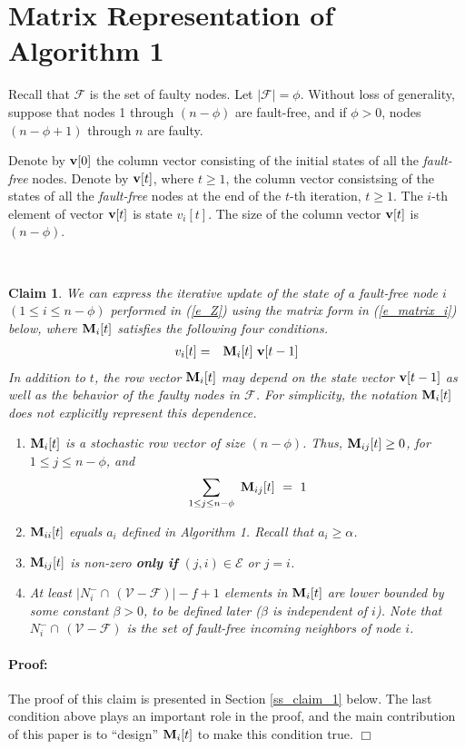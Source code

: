 \documentclass[letterpaper, 12pt]{article}
\newenvironment{proof}{\paragraph{\bf Proof:}}{\hspace*{\fill}\(\Box\)}
\newcommand{\scriptf}{\mathcal{F}}
\newcommand{\scripte}{\mathcal{E}}
\newcommand{\scriptv}{\mathcal{V}}
\newtheorem{claim}{Claim}
\begin{document}
\section{Matrix Representation of Algorithm 1}
\label{s_claim}

Recall that $\scriptf$ is the set of faulty nodes.
Let $|\scriptf|=\phi$.
Without loss of generality, suppose that nodes 1 through $(n-\phi)$ are
fault-free, and if $\phi>0$, nodes $(n-\phi+1)$ through $n$ are faulty.

Denote by ${\bf v}[0]$ the column vector consisting of the initial states of
all the {\em fault-free} nodes.
Denote by ${\bf v}[t]$, where $t\geq 1$, the column vector consistsing of
the states of all the {\em fault-free} nodes
at the end of the $t$-th iteration, $t\geq 1$.
The $i$-th element
of vector ${\bf v}[t]$ is state $v_i[t]$. The size of the column
vector ${\bf v}[t]$ is
$(n-\phi)$.



~

\begin{claim}
\label{claim_1}
{
We can express the iterative update of the state
of a fault-free node $i$ $(1\leq i\leq n-\phi)$
performed in (\ref{e_Z}) using the matrix form in (\ref{e_matrix_i})
below,
where ${\bf M}_i[t]$ satisfies the following four conditions.
\begin{eqnarray}
v_i[t] & = & {\bf M}_i[t] ~ {{\bf v}}[t-1]
\label{e_matrix_i}
\end{eqnarray}
}
In addition to $t$, the row vector ${\bf M}_i[t]$ 
may depend on the state vector ${\bf v}[t-1]$ as well as the
behavior of the faulty
nodes in $\scriptf$. For simplicity, the notation ${\bf M}_i[t]$ does not
explicitly represent this dependence. 
\begin{enumerate}
\item ${\bf M}_i[t]$ is a {\em stochastic} row vector of size $(n-\phi)$.
Thus,
${\bf M}_{ij}[t]\geq 0$, for $1\leq j\leq n-\phi$, and
\[
\sum_{1\leq j\leq n-\phi}~{\bf M}_{ij}[t] ~ = ~ 1
\]

\item ${\bf M}_{ii}[t]$ equals $a_i$ defined in Algorithm 1. 
Recall that $a_i\geq \alpha$.

\item ${\bf M}_{ij}[t]$ is non-zero
{\bf only if}  $(j,i)\in\scripte$ or $j=i$.
\item At least $|N_i^-\cap\,(\scriptv-\scriptf)| - f+1$ elements in ${\bf M}_i[t]$ 
are lower bounded by some constant $\beta>0$, to be defined later
($\beta$ is independent of $i$). 
Note that $N_i^-\cap\,(\scriptv-\scriptf)$ is the set of fault-free
incoming neighbors of node $i$.
\end{enumerate}

\end{claim}
\begin{proof}
The proof of this claim is presented in Section \ref{ss_claim_1} below.
The last condition above plays an important role in the proof, and the
main contribution of this paper is to ``design'' ${\bf M}_i[t]$ to make this
condition true.
\end{proof}
\end{document}

